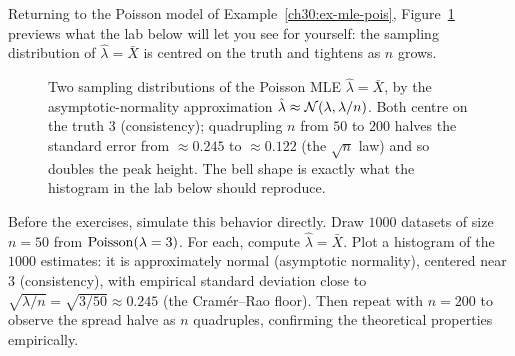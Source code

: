 Returning to the Poisson model of Example~\ref{ch30:ex-mle-pois},
Figure~\ref{ch30:fig-sampling-narrow} previews what the lab below will let you
see for yourself: the sampling distribution of $\hat\lambda=\bar X$ is centred on
the truth and tightens as $n$ grows.

\begin{figure}[H]
\centering
{}
\caption{Two sampling distributions of the Poisson MLE $\hat\lambda=\bar X$, by
the asymptotic-normality approximation $\hat\lambda\approx\mathcal{N}(\lambda,
\lambda/n)$. Both centre on the truth $3$ (consistency); quadrupling $n$ from
$50$ to $200$ halves the standard error from $\approx 0.245$ to $\approx 0.122$
(the $\sqrt n$ law) and so doubles the peak height. The bell shape is exactly what the histogram in the lab below should reproduce.}
\label{ch30:fig-sampling-narrow}
\end{figure}

\begin{labbox}
Before the exercises, simulate this behavior directly. Draw $1000$ datasets of
size $n=50$ from $\operatorname{Poisson}(\lambda=3)$. For each, compute $\hat\lambda=\bar X$.
Plot a histogram of the $1000$ estimates: it is approximately normal (asymptotic
normality), centered near $3$ (consistency), with empirical standard deviation close to
$\sqrt{\lambda/n}=\sqrt{3/50}\approx 0.245$ (the Cram\'er--Rao floor). Then repeat
with $n=200$ to observe the spread halve as $n$ quadruples, confirming the
theoretical properties empirically.
\end{labbox}

